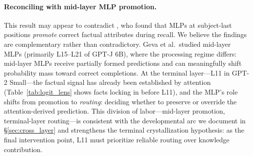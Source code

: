 \documentclass{article}
\begin{document}
\paragraph{Reconciling with mid-layer MLP promotion.}
This result may appear to contradict \citet{geva2023dissecting}, who found that
MLPs at subject-last positions \emph{promote} correct factual attributes during
recall. We believe the findings are complementary rather than contradictory.
Geva et al.\ studied mid-layer MLPs (primarily L15--L21 of GPT-J 6B), where
the processing regime differs: mid-layer MLPs receive partially formed
predictions and can meaningfully shift probability mass toward correct
completions. At the terminal layer---L11 in GPT-2 Small---the factual signal
has already been established by attention (Table~\ref{tab:logit_lens} shows
facts locking in before L11), and the MLP's role shifts from promotion to
\emph{routing}: deciding whether to preserve or override the attention-derived
prediction. This division of labor---mid-layer promotion, terminal-layer
routing---is consistent with the developmental arc we document in
\S\ref{sec:cross_layer} and strengthens the terminal crystallization hypothesis:
as the final intervention point, L11 must prioritize reliable routing over
knowledge contribution.
\end{document}
